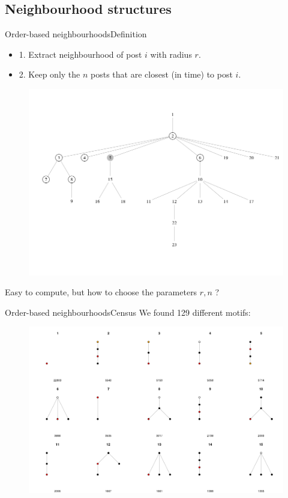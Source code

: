 \documentclass{beamer}
\begin{document}
\subsection{Neighbourhood structures}
\begin{frame}{Order-based neighbourhoods}{Definition}
\begin{itemize}
	\item 1. Extract neighbourhood of post $i$ with radius $r$.
	\item 2. Keep only the $n$ posts that are closest (in time) to post $i$. 
\end{itemize}
	\begin{figure}
		\centering
		\includegraphics[width=01\textwidth]{order_neighbourhood}
	\end{figure}
Easy to compute, but how to choose the parameters $r,n$ ?  	
\end{frame}

\begin{frame}{Order-based neighbourhoods}{Census}
We found 129 different motifs:
	\begin{figure}
		\centering
		\includegraphics[width=1\textwidth]{neighbourhoods_2_4_1}
	\end{figure}
\end{frame}
\end{document}
